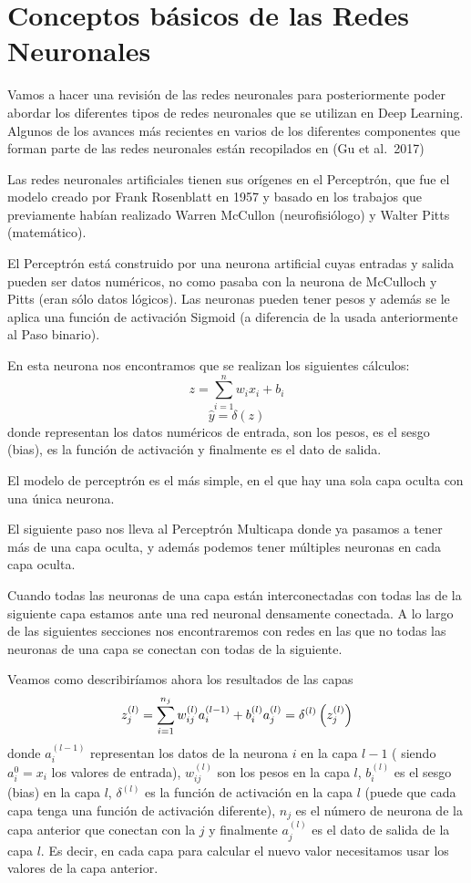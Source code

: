\documentclass[
  a4paper,
  DIV=11,
  numbers=noendperiod]{scrreprt}
\begin{document}
\section{Conceptos básicos de las Redes
Neuronales}\label{conceptos-buxe1sicos-de-las-redes-neuronales}

Vamos a hacer una revisión de las redes neuronales para posteriormente
poder abordar los diferentes tipos de redes neuronales que se utilizan
en Deep Learning. Algunos de los avances más recientes en varios de los
diferentes componentes que forman parte de las redes neuronales están
recopilados en (Gu et al.~2017)

Las redes neuronales artificiales tienen sus orígenes en el Perceptrón,
que fue el modelo creado por Frank Rosenblatt en 1957 y basado en los
trabajos que previamente habían realizado Warren McCullon
(neurofisiólogo) y Walter Pitts (matemático).

El Perceptrón está construido por una neurona artificial cuyas entradas
y salida pueden ser datos numéricos, no como pasaba con la neurona de
McCulloch y Pitts (eran sólo datos lógicos). Las neuronas pueden tener
pesos y además se le aplica una función de activación Sigmoid (a
diferencia de la usada anteriormente al Paso binario).

En esta neurona nos encontramos que se realizan los siguientes cálculos:
\[ z = \sum_{i=1}^{n}w_ix_i+b_i\] \[\hat{y} = \delta (z)\] donde
representan los datos numéricos de entrada, son los pesos, es el sesgo
(bias), es la función de activación y finalmente es el dato de salida.

El modelo de perceptrón es el más simple, en el que hay una sola capa
oculta con una única neurona.

El siguiente paso nos lleva al Perceptrón Multicapa donde ya pasamos a
tener más de una capa oculta, y además podemos tener múltiples neuronas
en cada capa oculta.

Cuando todas las neuronas de una capa están interconectadas con todas
las de la siguiente capa estamos ante una red neuronal densamente
conectada. A lo largo de las siguientes secciones nos encontraremos con
redes en las que no todas las neuronas de una capa se conectan con todas
de la siguiente.

Veamos como describiríamos ahora los resultados de las capas \[
z_j^{(l)}=\sum_{i=1}^{n_j} w_{i j}^{(l)} a_i^{(l-1)}+b_i^{(l)} \\
a_j^{(l)}=\delta^{(l)}\left(z_j^{(l)}\right)
\] donde \(a_i^{(l-1)}\) representan los datos de la neurona \(i\) en la
capa \(l-1\) ( siendo \(a_i^0=x_i\) los valores de entrada),
\(w_{i j}^{(l)}\) son los pesos en la capa \(l\), \(b_i^{(l)}\) es el
sesgo (bias) en la capa \(l\), \(\delta^{(l)}\) es la función de
activación en la capa \(l\) (puede que cada capa tenga una función de
activación diferente), \(n_j\) es el número de neurona de la capa
anterior que conectan con la \(j\) y finalmente \(a_j^{(l)}\) es el dato
de salida de la capa \(l\). Es decir, en cada capa para calcular el
nuevo valor necesitamos usar los valores de la capa anterior.
\end{document}
